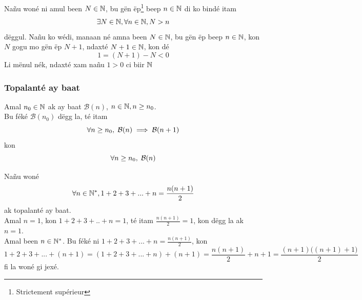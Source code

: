 \documentclass[twoside, a4paper]{article}
\begin{document}
Nañu woné ni amul been $N \in \mathbb{N}$, bu gën ëp\footnote{Strictement supérieur} beep $n \in \mathbb{N}$ di ko bindé itam $$\exists N \in \mathbb{N}, \forall n \in \mathbb{N}, N > n$$
dëggul. Nañu ko wédi, manaan né amna been $N \in \mathbb{N}$, bu gën ëp beep $n \in \mathbb{N}$, kon $N$  gogu mo gën ëp $N+1$, ndaxté $N+1 \in \mathbb{N}$, kon dé $$1 = (N+1) - N < 0$$
Li mënul nék, ndaxté xam nañu $1 > 0$ ci biir $\mathbb{N}$

\subsubsection{Topalanté ay baat}

\begin{tcolorbox}[enhanced jigsaw,breakable,pad at break*=1mm, colback=red!5!white,colframe=white!75!black,title= Téeki,watermark color=white]
  Amal $n_0 \in \mathbb{N}$ ak ay baat $\mathcal{B}(n)$, $n \in \mathbb{N}, n \geq n_0$.\\
  Bu féké $\mathcal{B}(n_0)$ dëgg la, té itam
  $$\forall n\geq n_0, \hspace{0.1cm}\mathcal{B}(n) \implies \mathcal{B}(n+1)$$
  kon
  $$\forall n \geq n_0, \hspace{0.1cm} \mathcal{B}(n)$$
\end{tcolorbox}

Nañu woné $$\forall n \in \mathbb{N}^{*}, 1+2+3+...+n=\frac{n(n+1)}{2}$$
ak topalanté ay baat.\\
Amal $n=1$, kon $1+2+3+..+n=1$, té itam $\frac{n(n+1)}{2} = 1$, kon dëgg la ak $n=1$.\\
Amal been $n \in \mathbb{N}^{*}$. Bu féké ni $1+2+3+...+n=\frac{n(n+1)}{2}$, kon
$$1+2+3+...+(n+1) = (1+2+3+...+n)+(n+1) = \frac{n(n+1)}{2} + n+1 = \frac{(n+1)\big((n+1)+1\big)}{2}$$
fi la woné gi jexé.
\end{document}
